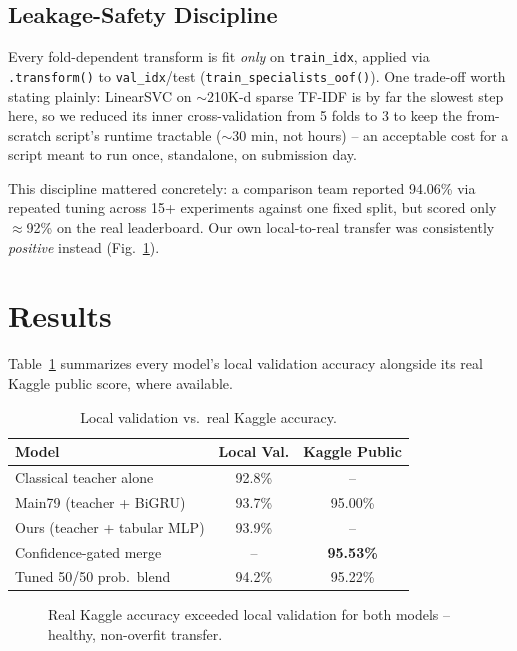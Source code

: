 \documentclass[10pt,twocolumn]{article}
\begin{document}
\subsection{Leakage-Safety Discipline}
Every fold-dependent transform is fit \emph{only} on \texttt{train\_idx}, applied via \texttt{.transform()} to \texttt{val\_idx}/test (\texttt{train\_specialists\_oof()}). One trade-off worth stating plainly: LinearSVC on $\sim$210K-d sparse TF-IDF is by far the slowest step here, so we reduced its inner cross-validation from 5 folds to 3 to keep the from-scratch script's runtime tractable ($\sim$30 min, not hours) -- an acceptable cost for a script meant to run once, standalone, on submission day.

This discipline mattered concretely: a comparison team reported 94.06\% via repeated tuning across 15+ experiments against one fixed split, but scored only $\approx$92\% on the real leaderboard. Our own local-to-real transfer was consistently \emph{positive} instead (Fig.~\ref{fig:transfer}).

\section{Results}
\label{sec:results}
Table~\ref{tab:results} summarizes every model's local validation accuracy alongside its real Kaggle public score, where available.

\begin{table}[!htb]
\centering\small
\begin{tabular}{@{}lcc@{}}
\toprule
Model & Local Val. & Kaggle Public \\
\midrule
Classical teacher alone & 92.8\% & -- \\
Main79 (teacher + BiGRU) & 93.7\% & 95.00\% \\
Ours (teacher + tabular MLP) & 93.9\% & -- \\
Confidence-gated merge & -- & \textbf{95.53\%} \\
Tuned 50/50 prob.\ blend & 94.2\% & 95.22\% \\
\bottomrule
\end{tabular}
\caption{Local validation vs.\ real Kaggle accuracy.}
\label{tab:results}
\end{table}

\begin{figure}[!htb]
\centering
{}
\caption{Real Kaggle accuracy exceeded local validation for both models -- healthy, non-overfit transfer.}
\label{fig:transfer}
\end{figure}
\FloatBarrier
\end{document}
